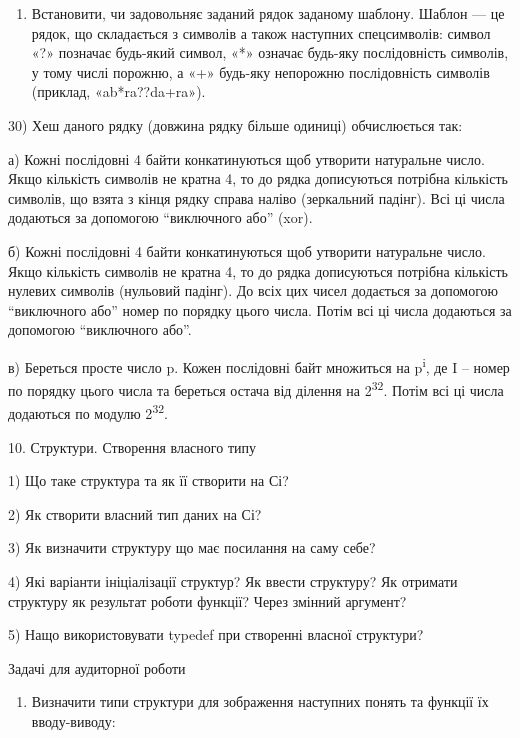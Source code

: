 \documentclass[]{article}
\begin{document}
\begin{enumerate}
\def\labelenumi{\arabic{enumi})}
\setcounter{enumi}{28}
\item
  Встановити, чи задовольняє заданий рядок заданому шаблону. Шаблон ---
  це рядок, що складається з символів а також наступних спецсимволів:
  символ «?» позначає будь-який символ, «*» означає будь-яку
  послідовність символів, у тому числі порожню, а «+» будь-яку непорожню
  послідовність символів (приклад, «ab*ra??da+ra»).
\end{enumerate}

30) Хеш даного рядку (довжина рядку більше одиниці) обчислюється так:

а) Кожні послідовні 4 байти конкатинуються щоб утворити натуральне
число. Якщо кількість символів не кратна 4, то до рядка дописуються
потрібна кількість символів, що взята з кінця рядку справа наліво
(зеркальний падінг). Всі ці числа додаються за допомогою ``виключного
або'' (xor).

б) Кожні послідовні 4 байти конкатинуються щоб утворити натуральне
число. Якщо кількість символів не кратна 4, то до рядка дописуються
потрібна кількість нулевих символів (нульовий падінг). До всіх цих чисел
додається за допомогою ``виключного або'' номер по порядку цього числа.
Потім всі ці числа додаються за допомогою ``виключного або''.

в) Береться просте число p. Кожен послідовні байт множиться на
p\textsuperscript{i}, де I -- номер по порядку цього числа та береться
остача від ділення на 2\textsuperscript{32}. Потім всі ці числа
додаються по модулю 2\textsuperscript{32}.

10. Структури. Створення власного типу

1) Що таке структура та як її створити на Сі?

2) Як створити власний тип даних на Сі?

3) Як визначити структуру що має посилання на саму себе?

4) Які варіанти ініціалізації структур? Як ввести структуру? Як отримати
структуру як результат роботи функції? Через змінний аргумент?

5) Нащо використовувати typedef при створенні власної структури?

Задачі для аудиторної роботи

\begin{enumerate}
\def\labelenumi{\arabic{enumi})}
\item
  \protect\hypertarget{_Hlk65237419}{}{}Визначити типи структури для
  зображення наступних понять та функції їх вводу-виводу:
\end{enumerate}
\end{document}
